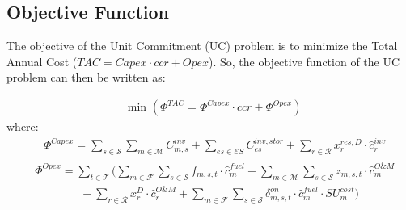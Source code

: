 \documentclass{article}
\newcommand{\cT}{{\mathcal T}}
\newcommand{\cM}{{\mathcal M}}
\newcommand{\cF}{{\mathcal F}}
\newcommand{\cS}{{\mathcal S}}
\newcommand{\cR}{{\mathcal R}}
\newcommand{\cES}{{\mathcal ES}}
\begin{document}
\subsection{Objective Function}
The objective of the Unit Commitment (UC) problem is to minimize the Total Annual Cost ($TAC=Capex \cdot ccr + Opex$). So, the objective function of the UC problem can then be written as:
{\allowdisplaybreaks
		\begin{align}
		& \text{min } \left( \Phi^{TAC} = \Phi^{Capex} \cdot ccr + \Phi^{Opex} \right)
		\label{eq:Obj_fun} %
		\end{align}
		where:
		\begin{align}
		& \Phi^{Capex} = \sum_{s \in \cS} \sum_{m \in \cM} C_{m,s}^{inv} +\sum_{es \in \cES} C_{es}^{inv, stor} + \sum_{r \in \cR} x_r^{res,D}\cdot \hat{c}_r^{inv}
		\label{eq:Obj_capex} %
		\end{align}
		\begin{align}
		\begin{split}
		& \Phi^{Opex} = \sum_{t \in \cT} \biggl( \sum_{m \in \cF} \sum_{s \in \cS} f_{m,s,t}\cdot \hat{c}_{m}^{fuel} + \sum_{m \in \cM} \sum_{s \in \cS} z_{m,s,t} \cdot \hat{c}_{m}^{O\&M} \\ 
		& \qquad \qquad + \sum_{r \in \cR} x_r^D \cdot \hat{c}_r^{O\&M}  + \sum_{m \in \cF} \sum_{s \in \cS} \delta_{m,s,t}^{on} \cdot \hat{c}_m^{fuel} \cdot SU_{m}^{cost} \biggr)
		\label{eq:Obj_opex} %
		\end{split}		
		\end{align}

}
\end{document}
